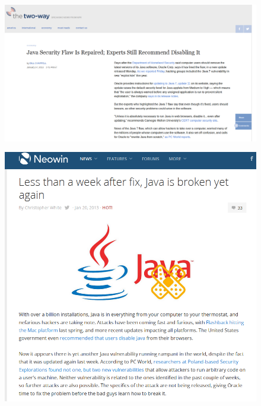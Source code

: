 \documentclass[12pt]{beamer}
\begin{document}
\begin{frame}
\begin{figure}
\centering
\includegraphics[width=\linewidth]{Images/not2}
\end{figure}
\end{frame}

\begin{frame}
\begin{figure}
\centering
\includegraphics[width=\linewidth]{Images/not3}
\end{figure}
\end{frame}
\end{document}
